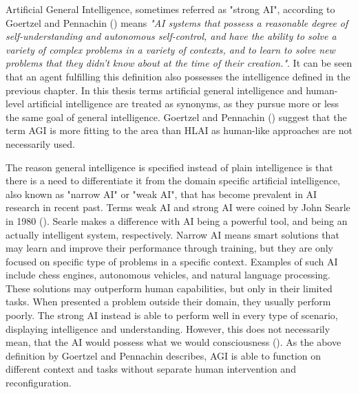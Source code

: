 \documentclass[utf8,english]{gradu3}
\begin{document}


Artificial General Intelligence, sometimes referred as "strong AI", according to
Goertzel and Pennachin (\cite*{goertzel2007}) means \emph{"AI systems that
possess a reasonable degree of self-understanding and autonomous self-control,
and have the ability to solve a variety of complex problems in a variety of
contexts, and to learn to solve new problems that they didn't know about at the
time of their creation."}. It can be seen that an agent fulfilling this
definition also possesses the intelligence defined in the previous chapter. In
this thesis terms artificial general intelligence and human-level artificial
intelligence are treated as synonyms, as they pursue more or less the same goal
of general intelligence. Goertzel and Pennachin (\cite*{goertzel2007}) suggest
that the term AGI is more fitting to the area than HLAI as human-like approaches
are not necessarily used.

The reason general intelligence is specified instead of plain intelligence is
that there is a need to differentiate it from the domain specific artificial
intelligence, also known as "narrow AI" or "weak AI", that has become prevalent
in AI research in recent past. Terms weak AI and strong AI were coined by John
Searle in 1980 (\cite{searle1980}). Searle makes a difference with AI being a
powerful tool, and being an actually intelligent system, respectively. Narrow AI
means smart solutions that may learn and improve their performance through
training, but they are only focused on specific type of problems in a specific
context. Examples of such AI include chess engines, autonomous vehicles, and
natural language processing. These solutions may outperform human capabilities,
but only in their limited tasks. When presented a problem outside their domain,
they usually perform poorly. The strong AI instead is able to perform well in
every type of scenario, displaying intelligence and understanding. However, this
does not necessarily mean, that the AI would possess what we would consciousness
(\cite{searle1980}). As the above definition by Goertzel and Pennachin
describes, AGI is able to function on different context and tasks without
separate human intervention and reconfiguration.
\end{document}
